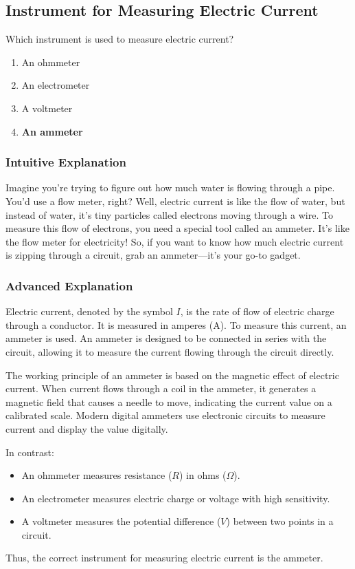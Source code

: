 \subsection{Instrument for Measuring Electric Current}
\label{T7D04}

\begin{tcolorbox}[colback=gray!10!white,colframe=black!75!black,title=T7D04]
Which instrument is used to measure electric current?  
\begin{enumerate}[label=\Alph*)]
    \item An ohmmeter
    \item An electrometer
    \item A voltmeter
    \item \textbf{An ammeter}
\end{enumerate}
\end{tcolorbox}

\subsubsection*{Intuitive Explanation}
Imagine you’re trying to figure out how much water is flowing through a pipe. You’d use a flow meter, right? Well, electric current is like the flow of water, but instead of water, it’s tiny particles called electrons moving through a wire. To measure this flow of electrons, you need a special tool called an ammeter. It’s like the flow meter for electricity! So, if you want to know how much electric current is zipping through a circuit, grab an ammeter—it’s your go-to gadget.

\subsubsection*{Advanced Explanation}
Electric current, denoted by the symbol \( I \), is the rate of flow of electric charge through a conductor. It is measured in amperes (A). To measure this current, an ammeter is used. An ammeter is designed to be connected in series with the circuit, allowing it to measure the current flowing through the circuit directly. 

The working principle of an ammeter is based on the magnetic effect of electric current. When current flows through a coil in the ammeter, it generates a magnetic field that causes a needle to move, indicating the current value on a calibrated scale. Modern digital ammeters use electronic circuits to measure current and display the value digitally.

In contrast:
\begin{itemize}
    \item An ohmmeter measures resistance (\( R \)) in ohms (\( \Omega \)).
    \item An electrometer measures electric charge or voltage with high sensitivity.
    \item A voltmeter measures the potential difference (\( V \)) between two points in a circuit.
\end{itemize}

Thus, the correct instrument for measuring electric current is the ammeter.

